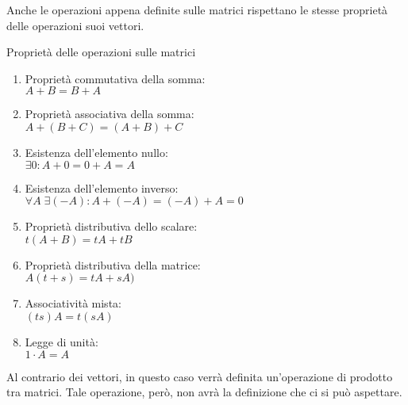Anche le operazioni appena definite sulle matrici rispettano le stesse proprietà delle operazioni suoi vettori.
\begin{teo}{Proprietà delle operazioni sulle matrici}
    \begin{enumerate}
        \item Proprietà commutativa della somma: \\
              $A + B = B + A$

        \item Proprietà associativa della somma: \\
              $A + (B + C) = (A + B) + C$

        \item Esistenza dell'elemento nullo: \\
              $\exists 0 : A + 0 = 0 + A = A$

        \item Esistenza dell'elemento inverso: \\
              $\forall A\;\exists (-A) : A + (-A) = (-A) + A = 0$

        \item Proprietà distributiva dello scalare: \\
              $t(A + B) = tA + tB$

        \item Proprietà distributiva della matrice: \\
              $A(t + s) = tA + sA)$

        \item Associatività mista: \\
              $(ts)A = t(sA)$

        \item Legge di unità: \\
              $1 \cdot A = A$
    \end{enumerate}
\end{teo}

Al contrario dei vettori, in questo caso verrà definita un'operazione di prodotto tra matrici. Tale operazione, però, non avrà la definizione che ci si può aspettare.

